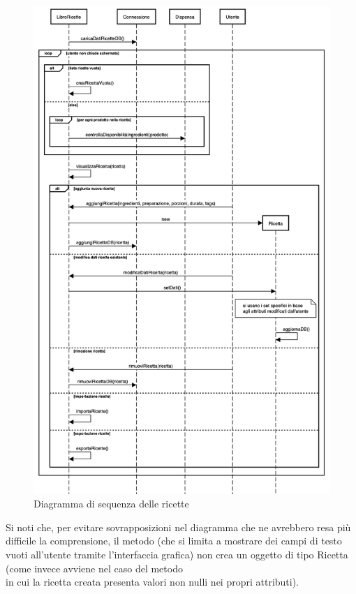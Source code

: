 \begin{figure}[H]
    \includegraphics[width=\linewidth]{images/sequence-recipe.png}
    \caption{Diagramma di sequenza delle ricette}
    \label{fig:seqrecipe}
\end{figure}

Si noti che, per evitare sovrapposizioni nel diagramma che ne avrebbero resa più difficile la comprensione, il metodo  (che si limita a mostrare dei campi di testo vuoti all'utente tramite l'interfaccia grafica) non crea un oggetto di tipo Ricetta (come invece avviene nel caso del metodo \\  in cui la ricetta creata presenta valori non nulli nei propri attributi).

